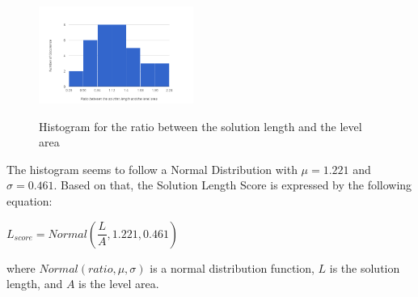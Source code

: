 \documentclass[letterpaper]{article}
\begin{document}
\begin{itemize}
	\begin{figure}
		\centering
		\includegraphics[width=0.45\textwidth]{Images/solutionLengthHistogram}
		\label{Figure:solutionLengthHistogram}
		\caption{Histogram for the ratio between the solution length and the level area}
	\end{figure}
	
	The histogram seems to follow a Normal Distribution with $\mu = 1.221$ and $\sigma = 0.461$. Based on that, the Solution Length Score is expressed by the following equation:
	\begin{center}$L_{score} = Normal(\dfrac{L}{A}, 1.221, 0.461)$\end{center}
	where $Normal(ratio, \mu, \sigma)$ is a normal distribution function, $L$ is the solution length, and $A$ is the level area.
	

\end{itemize}
\end{document}
